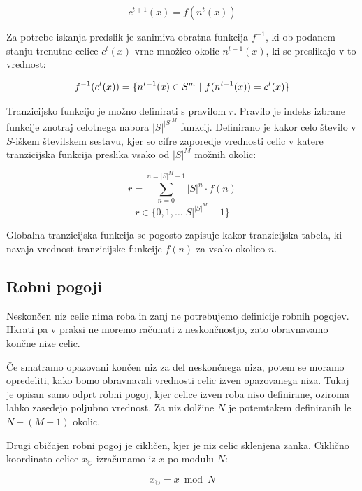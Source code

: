 \documentclass[12pt,a4paper,openany,twoside]{book}
\begin{document}
\begin{equation}
c^{t+1}(x) = f(n^{t}(x))
\end{equation}

Za potrebe iskanja predslik je zanimiva obratna funkcija \(f^{-1}\), ki ob
podanem stanju trenutne celice \(c^{t}(x)\) vrne množico okolic \(n^{t-1}(x)\),
ki se preslikajo v to vrednost:

\begin{equation}
f^{-1}(c^{t}(x)) = \{ n^{t-1}(x) \in S^m \ \arrowvert \ f(n^{t-1}(x)) = c^{t}(x) \}
\end{equation}

Tranzicijsko funkcijo je možno definirati s pravilom  \(r\).
Pravilo je indeks izbrane funkcije znotraj celotnega nabora \(|S|^{|S|^M}\) funkcij.
Definirano je kakor celo število v \(S\)-iškem številskem sestavu,
kjer so cifre zaporedje vrednosti celic v katere tranzicijska funkcija
preslika vsako od \(|S|^M\) možnih okolic:

\begin{equation}
r = \sum_{n=0}^{n=|S|^M-1} |S|^n \cdot f(n)
\end{equation}
\begin{equation}
r \in \{0, 1, \ldots |S|^{|S|^M}-1\}
\end{equation}

Globalna tranzicijska funkcija se pogosto zapisuje kakor tranzicijska tabela,
ki navaja vrednost tranzicijske funkcije \(f(n)\) za vsako okolico \(n\).

\subsection{Robni pogoji}

Neskončen niz celic nima roba in zanj ne potrebujemo definicije robnih pogojev.
Hkrati pa v praksi ne moremo računati z neskončnostjo,
zato obravnavamo končne nize celic.

Če smatramo opazovani končen niz za del neskončnega niza,
potem se moramo opredeliti, kako bomo obravnavali vrednosti celic izven opazovanega niza.
Tukaj je opisan samo odprt robni pogoj, kjer celice izven roba niso definirane,
oziroma lahko zasedejo poljubno vrednost.
Za niz dolžine \(N\) je potemtakem definiranih le \(N-(M-1)\) okolic.

Drugi običajen robni pogoj je cikličen, kjer je niz celic sklenjena zanka.
Ciklično koordinato celice \(x_{\circlearrowright}\) izračunamo iz \(x\) po modulu \(N\):

\begin{equation}
x_{\circlearrowright} = x \bmod N
\end{equation}
\end{document}
